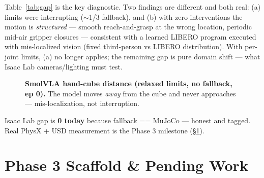 \documentclass[11pt,a4paper,twocolumn]{article}
\begin{document}
Table~\ref{tab:gap} is the key diagnostic. Two findings are different and both real: (a) limits were interrupting ($\sim$1/3 fallback), and (b) with zero interventions the motion is \textit{structured} --- smooth reach-and-grasp at the wrong location, periodic mid-air gripper closures --- consistent with a learned LIBERO program executed with mis-localized vision (fixed third-person vs LIBERO distribution). With per-joint limits, (a) no longer applies; the remaining gap is pure domain shift --- what Isaac Lab cameras/lighting must test.

\begin{figure}[htbp]
\centering
{}
\caption{\textbf{SmolVLA hand-cube distance (relaxed limits, no fallback, ep 0).} The model moves \textit{away} from the cube and never approaches --- mis-localization, not interruption.}
\label{fig:dist}
\end{figure}

Isaac Lab gap is \textbf{0 today} because fallback == MuJoCo --- honest and tagged. Real PhysX + USD measurement is the Phase 3 milestone (\S\ref{sec:pending}).

\section{Phase 3 Scaffold \& Pending Work}
\label{sec:pending}
\end{document}
